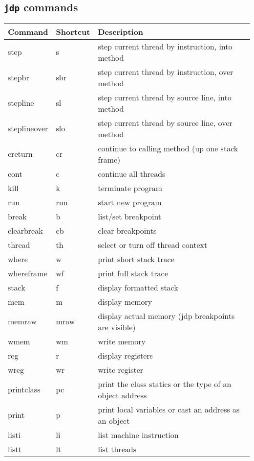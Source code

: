 \subsection {{\tt jdp} commands}

\begin{tabular}{|l|l|l|} \hline
Command       & Shortcut & Description     \\ \hline
step          & s   & step current thread by instruction, into method           \\ 
stepbr        & sbr & step current thread by instruction, over method           \\ 
stepline      & sl  & step current thread by source line, into method   \\ 
steplineover  & slo & step current thread by source line, over method   \\ 
creturn       & cr  & continue to calling method (up one stack frame)           \\ 
cont          & c   & continue all threads                                      \\ 
kill          & k   & terminate program                                         \\ 
run           & run & start new program                                         \\ 
break         & b   & list/set breakpoint                                       \\ 
clearbreak    & cb  & clear breakpoints                                         \\ 

thread        & th  & select or turn off thread context                         \\ 
where         & w   & print short stack trace                                   \\ 
whereframe    & wf  & print full stack trace                                    \\ 
stack         & f   & display formatted stack                                   \\ 
mem           & m   & display memory                                            \\ 
memraw        & mraw & display actual memory (jdp breakpoints are visible)      \\ 
wmem          & wm  & write memory                                              \\ 
reg           & r   & display registers                                         \\ 
wreg          & wr  & write register                                            \\ 
printclass    & pc  & print the class statics or the type of an object address  \\ 
print         & p   & print local variables or cast an address as an object     \\ 
listi         & li  & list machine instruction                                  \\ 
listt         & lt  & list threads                                              \\ \hline 


\end{tabular}
